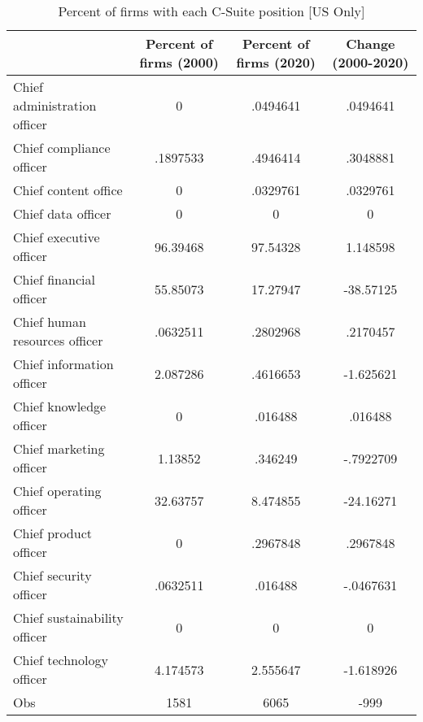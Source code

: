 \begin{table}[htbp]\centering
\caption{Percent of firms with each C-Suite position [US Only]\label{tab98}}
\begin{tabular}{l*{3}{c}}
\toprule
                    &Percent of firms (2000)&Percent of firms (2020)&Change (2000-2020)\\
\midrule
Chief administration officer&           0&    .0494641&    .0494641\\
Chief compliance officer&    .1897533&    .4946414&    .3048881\\
Chief content office&           0&    .0329761&    .0329761\\
Chief data officer  &           0&           0&           0\\
Chief executive officer&    96.39468&    97.54328&    1.148598\\
Chief financial officer&    55.85073&    17.27947&   -38.57125\\
Chief human resources officer&    .0632511&    .2802968&    .2170457\\
Chief information officer&    2.087286&    .4616653&   -1.625621\\
Chief knowledge officer&           0&     .016488&     .016488\\
Chief marketing officer&     1.13852&     .346249&   -.7922709\\
Chief operating officer&    32.63757&    8.474855&   -24.16271\\
Chief product officer&           0&    .2967848&    .2967848\\
Chief security officer&    .0632511&     .016488&   -.0467631\\
Chief sustainability officer&           0&           0&           0\\
Chief technology officer&    4.174573&    2.555647&   -1.618926\\
Obs                 &        1581&        6065&        -999\\
\bottomrule
\end{tabular}
\end{table}
